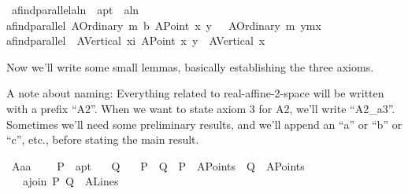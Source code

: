 \begin{isabellebody}
\isanewline
{}\isamarkupfalse%
\ a{}find{\isacharunderscore}{\kern0pt}parallel{\isacharcolon}{\kern0pt}{\isacharcolon}{\kern0pt}{\isachardoublequoteopen}a{}ln\ {\isasymRightarrow}\ a{}pt\ {\isasymRightarrow}\ a{}ln{\isachardoublequoteclose}\ \isanewline
{\isachardoublequoteopen}a{}find{\isacharunderscore}{\kern0pt}parallel\ {\isacharparenleft}{\kern0pt}A{}Ordinary\ m\ b{\isacharparenright}{\kern0pt}\ {\isacharparenleft}{\kern0pt}A{}Point\ x\ y{\isacharparenright}{\kern0pt}\ \ {\isacharequal}{\kern0pt}\ {\isacharparenleft}{\kern0pt}A{}Ordinary\ m\ {\isacharparenleft}{\kern0pt}y{\isacharminus}{\kern0pt}m{\isacharasterisk}{\kern0pt}x{\isacharparenright}{\kern0pt}{\isacharparenright}{\kern0pt}{\isachardoublequoteclose}\ {\isacharbar}{\kern0pt}\isanewline
{\isachardoublequoteopen}a{}find{\isacharunderscore}{\kern0pt}parallel\ \ {\isacharparenleft}{\kern0pt}A{}Vertical\ xi{\isacharparenright}{\kern0pt}\ {\isacharparenleft}{\kern0pt}A{}Point\ x\ y{\isacharparenright}{\kern0pt}\ {\isacharequal}{\kern0pt}\ {\isacharparenleft}{\kern0pt}A{}Vertical\ x{\isacharparenright}{\kern0pt}{\isachardoublequoteclose}%
\begin{isamarkuptext}%
Now we'll write some small lemmas, basically establishing the three axioms.%
\end{isamarkuptext}\isamarkuptrue%
%
\begin{isamarkuptext}%
A note about naming: Everything related to real-affine-2-space will be written with a prefix
``A2''. When we want to state axiom 3 for A2, we'll write ``A2\_a3''. Sometimes we'll need some preliminary
results, and we'll append an ``a'' or ``b'' or ``c'', etc., before stating the main result. \caleb%
\end{isamarkuptext}\isamarkuptrue%
\isamarkupfalse%
\ A{}{\isacharunderscore}{\kern0pt}a{}a{}{\isacharcolon}{\kern0pt}\ \isanewline
\ \ \ P\ {\isacharcolon}{\kern0pt}{\isacharcolon}{\kern0pt}\ a{}pt\isanewline
\ \ \ Q\isanewline
\ \ \ {\isachardoublequoteopen}P\ {\isasymnoteq}\ Q{\isachardoublequoteclose}\ \ {\isachardoublequoteopen}P\ {\isasymin}\ A{}Points{\isachardoublequoteclose}\ \ {\isachardoublequoteopen}Q\ {\isasymin}\ A{}Points{\isachardoublequoteclose}\isanewline
\ \ \ {\isachardoublequoteopen}a{}join\ P\ Q\ {\isasymin}\ A{}Lines{\isachardoublequoteclose}\isanewline

\end{isabellebody}
